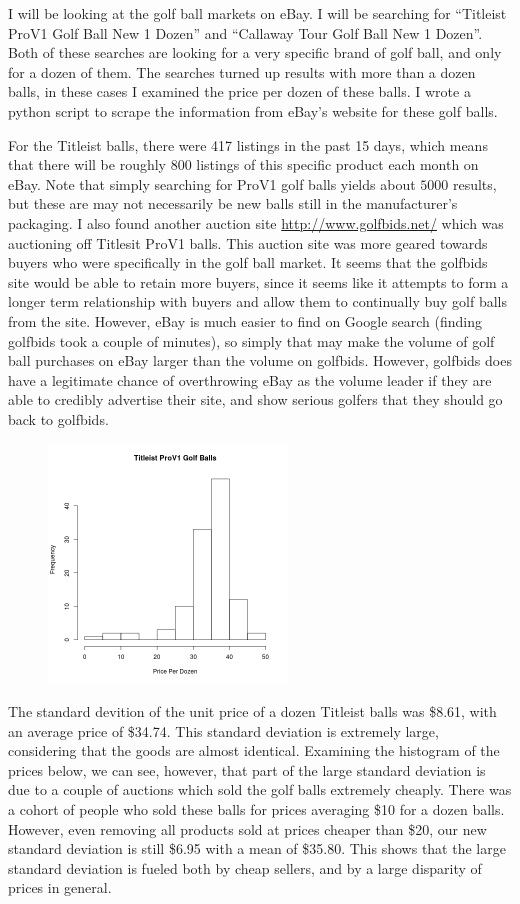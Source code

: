 \documentclass[psamsfonts]{amsart}
\newenvironment{sol}{\vspace{0.25cm}{\large \bfseries Solution:}}{\qedsymbol}
\begin{document}
\begin{sol}
I will be looking at the golf ball markets on eBay. I will be searching for ``Titleist ProV1 Golf Ball New 1 Dozen'' and ``Callaway Tour Golf Ball New 1 Dozen''. Both of these searches are looking for a very specific brand of golf ball, and only for a dozen of them. The searches turned up results with more than a dozen balls, in these cases I examined the price per dozen of these balls. I wrote a python script to scrape the information from eBay's website for these golf balls.

For the Titleist balls, there were 417 listings in the past 15 days, which means that there will be roughly 800 listings of this specific product each month on eBay. Note that simply searching for ProV1 golf balls yields about $5000$ results, but these are may not necessarily be new balls still in the manufacturer's packaging. I also found another auction site \url{http://www.golfbids.net/} which was auctioning off Titlesit ProV1 balls. This auction site was more geared towards buyers who were specifically in the golf ball market. It seems that the golfbids site would be able to retain more buyers, since it seems like it attempts to form a longer term relationship with buyers and allow them to continually buy golf balls from the site. However, eBay is much easier to find on Google search (finding golfbids took a couple of minutes), so simply that may make the volume of golf ball purchases on eBay larger than the volume on golfbids. However, golfbids does have a legitimate chance of overthrowing eBay as the volume leader if they are able to credibly advertise their site, and show serious golfers that they should go back to golfbids.

\begin{figure}[h!]
\includegraphics[width=2.5in]{unit_price_histogram.png}
\end{figure}

The standard devition of the unit price of a dozen Titleist balls was \$8.61, with an average price of \$34.74. This standard deviation is extremely large, considering that the goods are almost identical. Examining the histogram of the prices below, we can see, however, that part of the large standard deviation is due to a couple of auctions which sold the golf balls extremely cheaply. There was a cohort of people who sold these balls for prices averaging \$10 for a dozen balls. However, even removing all products sold at prices cheaper than \$20, our new standard deviation is still \$6.95 with a mean of \$35.80. This shows that the large standard deviation is fueled both by cheap sellers, and by a large disparity of prices in general.


\end{sol}
\end{document}
